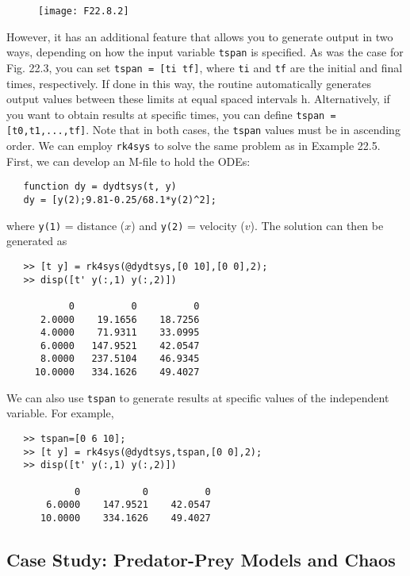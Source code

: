 \documentclass[../main.tex]{subfiles}
\begin{document}
\begin{figure}[hbt!]
	\texttt{[image: F22.8.2]}
	\label{F22.8.2}
\end{figure}

However, it has an additional feature that allows you to generate output in two ways,
depending on how the input variable \texttt{tspan} is specified. As was the case for Fig. 22.3, you
can set \texttt{tspan = [ti tf]}, where \texttt{ti} and \texttt{tf} are the initial and final times, respectively.
If done in this way, the routine automatically generates output values between these limits
at equal spaced intervals h. Alternatively, if you want to obtain results at specific times, you
can define \texttt{tspan = [t0,t1,...,tf]}. Note that in both cases, the \texttt{tspan} values must
be in ascending order.
We can employ \texttt{rk4sys} to solve the same problem as in Example 22.5. First, we can
develop an M-file to hold the ODEs:

\begin{verbatim}
   function dy = dydtsys(t, y)
   dy = [y(2);9.81-0.25/68.1*y(2)^2];
\end{verbatim}

where \texttt{y(1)} = distance ($x$) and \texttt{y(2)} = velocity ($v$). The solution can then be generated as

\begin{verbatim}
   >> [t y] = rk4sys(@dydtsys,[0 10],[0 0],2);
   >> disp([t' y(:,1) y(:,2)])
   
           0          0          0
      2.0000    19.1656    18.7256
      4.0000    71.9311    33.0995
      6.0000   147.9521    42.0547
      8.0000   237.5104    46.9345
     10.0000   334.1626    49.4027
\end{verbatim}

We can also use \texttt{tspan} to generate results at specific values of the independent variable. For example,

\begin{verbatim}
   >> tspan=[0 6 10];
   >> [t y] = rk4sys(@dydtsys,tspan,[0 0],2);
   >> disp([t' y(:,1) y(:,2)])

            0           0          0
       6.0000    147.9521    42.0547
      10.0000    334.1626    49.4027
\end{verbatim}

\subsection{Case Study: Predator-Prey Models and Chaos}
\end{document}
